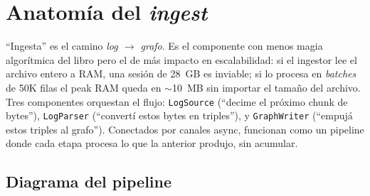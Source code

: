 \chapter{Anatomía del \emph{ingest}}
\label{cap:ingest-anatomy}

\begin{intuicion}
``Ingesta'' es el camino \emph{log $\to$ grafo}. Es el componente
con menos magia algorítmica del libro pero el de más impacto en
escalabilidad: si el ingestor lee el archivo entero a RAM, una
sesión de 28~GB es inviable; si lo procesa en \emph{batches} de 50K
filas el peak RAM queda en $\sim$10~MB sin importar el tamaño del
archivo. Tres componentes orquestan el flujo: \texttt{LogSource}
(``decime el próximo chunk de bytes''), \texttt{LogParser}
(``convertí estos bytes en triples''), y \texttt{GraphWriter}
(``empujá estos triples al grafo''). Conectados por canales async,
funcionan como un pipeline donde cada etapa procesa lo que la
anterior produjo, sin acumular.
\end{intuicion}

\section{Diagrama del pipeline}

